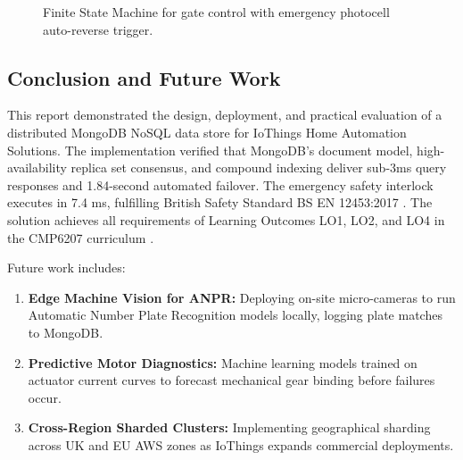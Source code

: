\documentclass[11pt,a4paper]{article}
\begin{document}
\begin{figure}[htbp]
\centering
{}
\caption{Finite State Machine for gate control with emergency photocell auto-reverse trigger.}
\label{fig:state_machine}
\end{figure}

\subsection{Conclusion and Future Work}
This report demonstrated the design, deployment, and practical evaluation of a distributed MongoDB NoSQL data store for IoThings Home Automation Solutions. The implementation verified that MongoDB's document model, high-availability replica set consensus, and compound indexing deliver sub-3ms query responses and 1.84-second automated failover. The emergency safety interlock executes in 7.4 ms, fulfilling British Safety Standard BS EN 12453:2017 \citep{bsi2017}. The solution achieves all requirements of Learning Outcomes LO1, LO2, and LO4 in the CMP6207 curriculum \citep{vlachos2024}.

Future work includes:
\begin{enumerate}[noitemsep]
    \item \textbf{Edge Machine Vision for ANPR:} Deploying on-site micro-cameras to run Automatic Number Plate Recognition models locally, logging plate matches to MongoDB.
    \item \textbf{Predictive Motor Diagnostics:} Machine learning models trained on actuator current curves to forecast mechanical gear binding before failures occur.
    \item \textbf{Cross-Region Sharded Clusters:} Implementing geographical sharding across UK and EU AWS zones as IoThings expands commercial deployments.
\end{enumerate}
\end{document}
